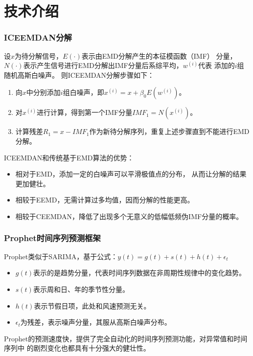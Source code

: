\documentclass[14pt, AutoFakeBold]{ppt}
\begin{document}
\section{技术介绍}
\begin{frame}
  \frametitle{ICEEMDAN分解}
  设$x$为待分解信号，$E(·)$表示由EMD分解产生的本征模函数（IMF）
  分量，$N(·)$表示产生信号进行EMD分解出IMF分量后系综平均，$w^{(i)}$代表
  添加的$i$组随机高斯白噪声。
  则ICEEMDAN分解步骤如下：
  \begin{enumerate}
    \item 向$x$中分别添加$i$组白噪声，即$x^{(i)}=x+\beta_0E(w^{(i)})$。
    \item 对$x^{(i)}$进行计算，得到第一个IMF分量$IMF_1=N(x^{(i)})$。
    \item 计算残差$R_1=x-IMF_1$作为新待分解序列，重复上述步骤直到不能进行EMD分解。
  \end{enumerate}
  ICEEMDAN和传统基于EMD算法的优势：
  \begin{itemize}
    \item 相对于EMD，添加一定的白噪声可以平滑极值点的分布，
    从而让分解的结果更加健壮。
    \item 相较于EEMD，无需计算过多均值，因而分解的性能更高。
    \item 相较于CEEMDAN，降低了出现多个无意义的低幅低频伪IMF分量的概率。
  \end{itemize}
\end{frame}

\begin{frame}
  \frametitle{Prophet时间序列预测框架}
  Prophet类似于SARIMA，基于公式：$y(t)=g(t)+s(t)+h(t)+\epsilon_t$

  \begin{itemize}
    \item $g(t)$表示的是趋势分量，代表时间序列数据在非周期性规律中的变化趋势。
    \item $s(t)$表示周和日、年的季节性分量。
    \item $h(t)$表示节假日项，此处和风速预测无关。
    \item $\epsilon_{t}$为残差，表示噪声分量，其服从高斯白噪声分布。
  \end{itemize}
  \rightline{}
  Prophet的预测速度快，提供了完全自动化的时间序列预测功能，对异常值和时间序列中
的剧烈变化也都具有十分强大的健壮性。
\end{frame}
\end{document}
